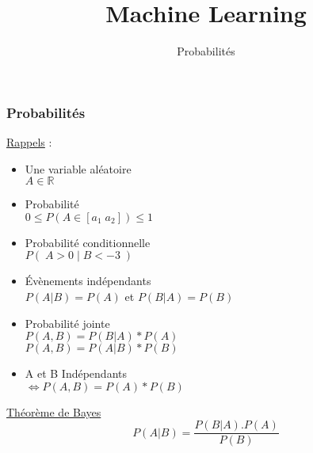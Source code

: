 \documentclass{formation}
\title{Machine Learning}
\subtitle{Probabilités}
\begin{document}
\maketitle

\begin{frame}
  \frametitle{Probabilités}
  \begin{minipage}[c]{0.60\linewidth}
    \underline{Rappels} :
    \begin{itemize}
    \item Une variable aléatoire \\ $A\in\mathbb{R}$
    \item Probabilité \\ $0 \leq P(A\in[a_1\;a_2]) \leq 1$
    \item Probabilité conditionnelle \\ $P(\;A>0\;|\;B<-3\;)$
    \item Évènements indépendants \\ $P(A|B)=P(A)$ et $P(B|A)=P(B)$
    \item Probabilité jointe \\ $P(A,B)=P(B|A)*P(A)$ \\ $P(A,B)=P(A|B)*P(B)$
    \item A et B Indépendants \\ $\iff P(A,B) = P(A)*P(B)$ 
    \end{itemize}
  \end{minipage}\hfill
  \begin{minipage}[c]{0.39\linewidth}
    \begin{center}
      \underline{Théorème de Bayes}
      \[
      \boxed{P(A|B)=\frac{P(B|A).P(A)}{P(B)}}
      \]
    \end{center}
  \end{minipage}\hfill
\end{frame}
\end{document}
